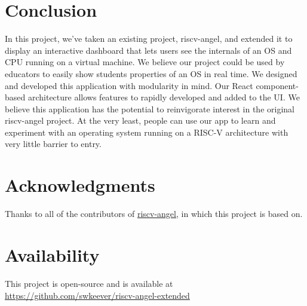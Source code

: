 \section*{Conclusion}

In this project, we've taken an existing project, riscv-angel, and extended it to display
an interactive dashboard that lets users see the internals of an OS and CPU running on
a virtual machine.
We believe our project could be used by educators to easily show students properties of
an OS in real time.
We designed and developed this application with modularity in mind.
Our React component-based architecture allows features to rapidly developed and added to the UI.
We believe this application has the potential to reinvigorate interest in the original riscv-angel project.
At the very least, people can use our app to learn and experiment with an operating system running on a RISC-V architecture
with very little barrier to entry.


\section*{Acknowledgments}

Thanks to all of the contributors of \href{https://github.com/riscv/riscv-angel}{riscv-angel},
in which this project is based on.

\section*{Availability}

This project is open-source and is available at
\href{https://github.com/swkeever/riscv-angel-extended}
{https://github.com/swkeever/riscv-angel-extended}





